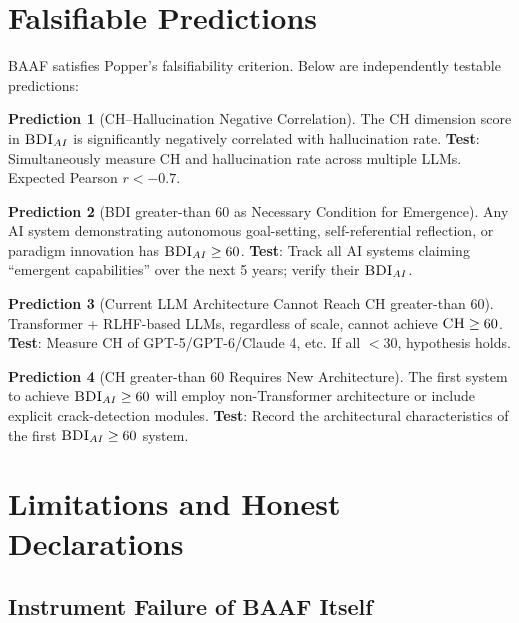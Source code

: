 \documentclass[11pt,a4paper]{article}
\theoremstyle{definition}
\newtheorem{prediction}{Prediction}[section]
\theoremstyle{plain}
\newcommand{\BDI}{\textsc{BDI}}
\newcommand{\BAAF}{\textsc{BAAF}}
\newcommand{\CH}{\textsc{CH}}
\begin{document}
\section{Falsifiable Predictions}
\label{sec:predictions}

\BAAF{} satisfies Popper's falsifiability criterion. Below are independently testable predictions:

\begin{prediction}[CH--Hallucination Negative Correlation]
The \CH{} dimension score in $\BDI_{AI}$ is significantly negatively correlated with hallucination rate. \textbf{Test}: Simultaneously measure \CH{} and hallucination rate across multiple LLMs. Expected Pearson $r < -0.7$.
\end{prediction}

\begin{prediction}[BDI greater-than 60 as Necessary Condition for Emergence]
Any AI system demonstrating autonomous goal-setting, self-referential reflection, or paradigm innovation has $\BDI_{AI} \geq 60$. \textbf{Test}: Track all AI systems claiming ``emergent capabilities'' over the next 5 years; verify their $\BDI_{AI}$.
\end{prediction}

\begin{prediction}[Current LLM Architecture Cannot Reach CH greater-than 60]
Transformer + RLHF-based LLMs, regardless of scale, cannot achieve $\CH{} \geq 60$. \textbf{Test}: Measure \CH{} of GPT-5/GPT-6/Claude 4, etc. If all $< 30$, hypothesis holds.
\end{prediction}

\begin{prediction}[CH greater-than 60 Requires New Architecture]
The first system to achieve $\BDI_{AI} \geq 60$ will employ non-Transformer architecture or include explicit crack-detection modules. \textbf{Test}: Record the architectural characteristics of the first $\BDI_{AI} \geq 60$ system.
\end{prediction}

\section{Limitations and Honest Declarations}
\label{sec:limitations}

\subsection{Instrument Failure of \BAAF{} Itself}
\end{document}
